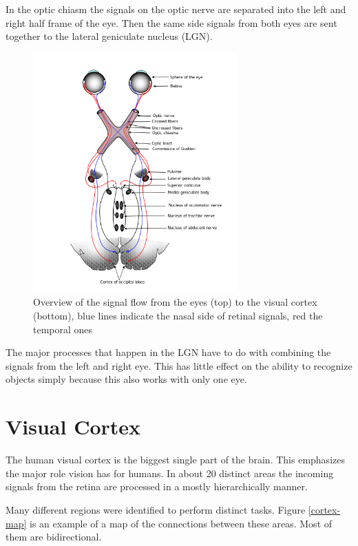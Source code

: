 		In the optic chiasm the signals on the optic nerve are separated into the left and right half frame of the eye. Then the same side signals from both eyes are sent together to the lateral geniculate nucleus (LGN).

		\begin{figure}[H]
			\centering
			\captionsetup{justification=centering,margin=1cm}
			\includegraphics[width=0.7\textwidth]{images/optic-chiasm.png}
			\caption{Overview of the signal flow from the eyes (top) to the visual cortex (bottom), blue lines indicate the nasal side of retinal signals, red the temporal ones}
		\end{figure}

		The major processes that happen in the LGN have to do with combining the signals from the left and right eye. This has little effect on the ability to recognize objects simply because this also works with only one eye.
		
	\section{Visual Cortex} \label{visual-cortex}
	
		The human visual cortex is the biggest single part of the brain. This emphasizes the major role vision has for humans. In about 20 distinct areas the incoming signals from the retina are processed in a mostly hierarchically manner.
		
		Many different regions were identified to perform distinct tasks. Figure \ref{cortex-map} is an example of a map of the connections between these areas. Most of them are bidirectional.

